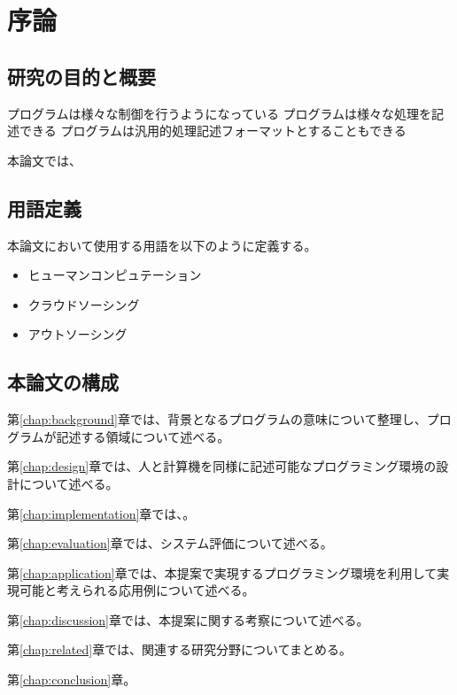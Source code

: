 \chapter{序論}\label{chap:introduction}

\section{研究の目的と概要}\label{ux7814ux7a76ux306eux76eeux7684ux3068ux6982ux8981}

プログラムは様々な制御を行うようになっている
プログラムは様々な処理を記述できる
プログラムは汎用的処理記述フォーマットとすることもできる

本論文では、

\section{用語定義}\label{ux7528ux8a9eux5b9aux7fa9}

本論文において使用する用語を以下のように定義する。

\begin{itemize}
\itemsep1pt\parskip0pt
\item
  ヒューマンコンピュテーション
\item
  クラウドソーシング
\item
  アウトソーシング
\end{itemize}

\section{本論文の構成}\label{ux672cux8ad6ux6587ux306eux69cbux6210}

第\ref{chap:background}章では、背景となるプログラムの意味について整理し、プログラムが記述する領域について述べる。

第\ref{chap:design}章では、人と計算機を同様に記述可能なプログラミング環境の設計について述べる。

第\ref{chap:implementation}章では、。

第\ref{chap:evaluation}章では、システム評価について述べる。

第\ref{chap:application}章では、本提案で実現するプログラミング環境を利用して実現可能と考えられる応用例について述べる。

第\ref{chap:discussion}章では、本提案に関する考察について述べる。

第\ref{chap:related}章では、関連する研究分野についてまとめる。

第\ref{chap:conclusion}章。
